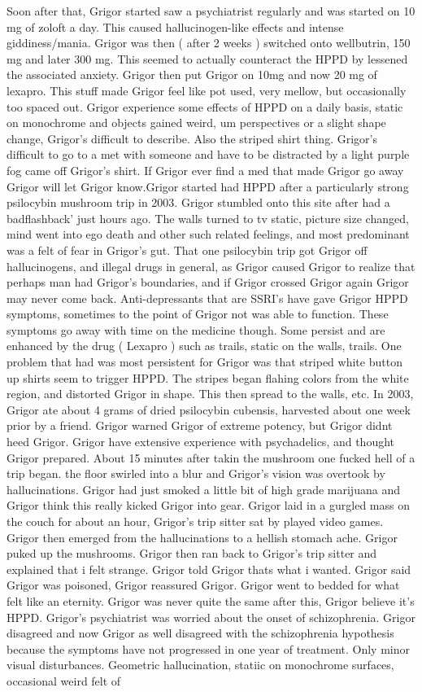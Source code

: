 \documentclass[12pt]{book}
\begin{document}
Soon after that, Grigor started saw a psychiatrist regularly and was started on 10 mg of zoloft a day. This caused hallucinogen-like effects and intense giddiness/mania. Grigor was then ( after 2 weeks ) switched onto wellbutrin, 150 mg and later 300 mg. This seemed to actually counteract the HPPD by lessened the associated anxiety. Grigor then put Grigor on 10mg and now 20 mg of lexapro. This stuff made Grigor feel like pot used, very mellow, but occasionally too spaced out. Grigor experience some effects of HPPD on a daily basis, static on monochrome and objects gained weird, um perspectives or a slight shape change, Grigor's difficult to describe. Also the striped shirt thing. Grigor's difficult to go to a met with someone and have to be distracted by a light purple fog came off Grigor's shirt. If Grigor ever find a med that made Grigor go away Grigor will let Grigor know.Grigor started had HPPD after a particularly strong psilocybin mushroom trip in 2003. Grigor stumbled onto this site after had a badflashback' just hours ago. The walls turned to tv static, picture size changed, mind went into ego death and other such related feelings, and most predominant was a felt of fear in Grigor's gut. That one psilocybin trip got Grigor off hallucinogens, and illegal drugs in general, as Grigor caused Grigor to realize that perhaps man had Grigor's boundaries, and if Grigor crossed Grigor again Grigor may never come back. Anti-depressants that are SSRI's have gave Grigor HPPD symptoms, sometimes to the point of Grigor not was able to function. These symptoms go away with time on the medicine though. Some persist and are enhanced by the drug ( Lexapro ) such as trails, static on the walls, trails. One problem that had was most persistent for Grigor was that striped white button up shirts seem to trigger HPPD. The stripes began flahing colors from the white region, and distorted Grigor in shape. This then spread to the walls, etc. In 2003, Grigor ate about 4 grams of dried psilocybin cubensis, harvested about one week prior by a friend. Grigor warned Grigor of extreme potency, but Grigor didnt heed Grigor. Grigor have extensive experience with psychadelics, and thought Grigor prepared. About 15 minutes after takin the mushroom one fucked hell of a trip began. the floor swirled into a blur and Grigor's vision was overtook by hallucinations. Grigor had just smoked a little bit of high grade marijuana and Grigor think this really kicked Grigor into gear. Grigor laid in a gurgled mass on the couch for about an hour, Grigor's trip sitter sat by played video games. Grigor then emerged from the hallucinations to a hellish stomach ache. Grigor puked up the mushrooms. Grigor then ran back to Grigor's trip sitter and explained that i felt strange. Grigor told Grigor thats what i wanted. Grigor said Grigor was poisoned, Grigor reassured Grigor. Grigor went to bedded for what felt like an eternity. Grigor was never quite the same after this, Grigor believe it's HPPD. Grigor's psychiatrist was worried about the onset of schizophrenia. Grigor disagreed and now Grigor as well disagreed with the schizophrenia hypothesis because the symptoms have not progressed in one year of treatment. Only minor visual disturbances. Geometric hallucination, statiic on monochrome surfaces, occasional weird felt of 
\end{document}
